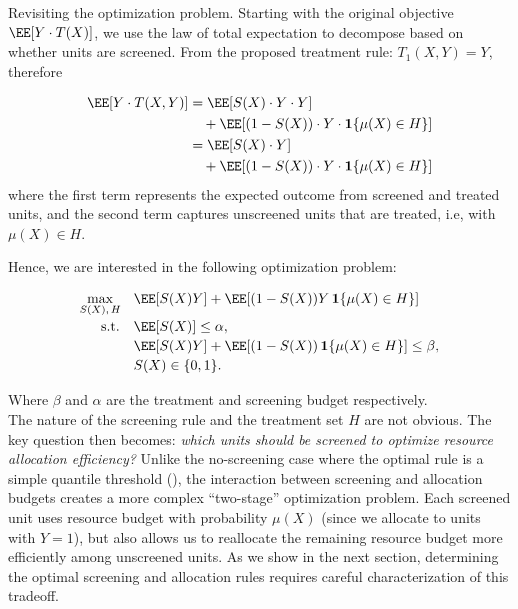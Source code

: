 Revisiting the optimization problem. Starting with the original objective $\EE[Y \cdot T(X)]$, we use the law of total expectation to decompose based on whether units are screened. From the proposed treatment rule: $T_1(X,Y) = Y$, therefore

\begin{align}
\EE[Y \cdot T(X,Y)] &= \EE[S(X) \cdot Y \cdot Y] \nonumber \\
&\quad + \EE[(1-S(X)) \cdot Y \cdot \mathbf{1}\{\mu(X) \in H\}] \\
&= \EE[S(X) \cdot Y] \nonumber \\
&\quad + \EE[(1-S(X)) \cdot Y \cdot \mathbf{1}\{\mu(X) \in H\}]
\end{align}
where the first term represents the expected outcome from screened and treated units, and the second term captures unscreened units that are treated, i.e, with $\mu(X) \in H$.

Hence, we are interested in the following optimization problem:

\begin{align}\label{opt}
\small
\max_{S(X),\, H} \quad
    & \EE\!\left[ S(X) Y \right]
      + \EE\!\left[(1-S(X)) Y\, \mathbf{1}\{\mu(X)\in H\}\right] \nonumber \\[-2pt]
\text{s.t.}\quad
    & \EE[S(X)] \le \alpha, \nonumber \\[-1pt]
    & \EE\!\left[ S(X) Y \right]
      + \EE\!\left[(1-S(X))\, \mathbf{1}\{\mu(X)\in H\}\right] \le \beta, \nonumber \\[-1pt]
    & S(X)\in\{0,1\}.
\end{align}


Where $\beta$ and $\alpha$ are the treatment and screening budget respectively.\\

The nature of the screening rule and the treatment set $H$ are not obvious. The key question then becomes: \textit{which units should be screened to optimize resource allocation efficiency?} Unlike the no-screening case where the optimal rule is a simple quantile threshold (), the interaction between screening and allocation budgets creates a more complex ``two-stage'' optimization problem. Each screened unit uses resource budget with probability $\mu(X)$ (since we allocate to units with $Y=1$), but also allows us to reallocate the remaining resource budget more efficiently among unscreened units. As we show in the next section, determining the optimal screening and allocation rules requires careful characterization of this tradeoff.

